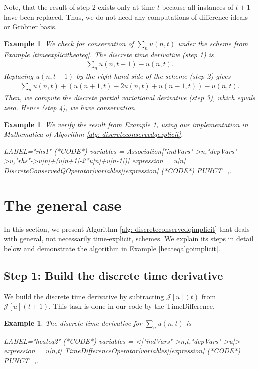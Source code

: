 \documentclass[sigconf,twocolumn]{acmart}
\newcommand{\1}{{\chi}}
\numberwithin{equation}{section}
\theoremstyle{thmlemcorr}
\numberwithin{theorem}{section}
\theoremstyle{thmlemcorr*}
\theoremstyle{defi}
\theoremstyle{remexample}
\newtheorem{example}[theorem]{Example}
\theoremstyle{ass}
\begin{document}
Note, that the result of step 2 exists only at time $t$ because all instances of $t+1$ have been replaced. Thus, we do not need any computations of difference ideals or Gr{\"o}bner basis.
\begin{example}
	\label{timeexplicitheateqalgo}
	We check for conservation of $\sum_nu(n,t)$ under the scheme from Example \ref{timeexplicitheateq}.
	The discrete time derivative (step 1) is
	\begin{gather*}
		\sum_nu(n,t+1)-u(n,t).
	\end{gather*}
	Replacing $u(n,t+1)$ by the right-hand side of the scheme (step 2) gives
	\begin{gather*}
		\sum_nu(n,t)+(u(n+1,t)-2u(n,t)+u(n-1,t))-u(n,t).
	\end{gather*}
	Then, we compute the discrete partial variational derivative (step 3), which equals zero. Hence (step 4), we have conservation.
\end{example}
\begin{example}
	\label{heatex1}
	We verify the result from Example \ref{timeexplicitheateqalgo}, using our implementation in {\sc Mathematica} of Algorithm \ref{alg: discreteconservedqexplicit}.
	\begin{EXE}
		LABEL="rhs1"
		(*CODE*)
		variables = Association["indVars"->{n},"depVars"->{u},"rhs"->{u[n]+(u[n+1]-2*u[n]+u[n-1])}]
		expression = u[n]
		DiscreteConservedQOperator[variables][expression]
		(*CODE*)
		PUNCT={,.}
	\end{EXE}
	\begin{small}
		
		
	\end{small}
\end{example}
\section{The general case}
In this section, we present Algorithm \ref{alg: discreteconservedqimplicit} that deals with general, not necessarily time-explicit, schemes. We explain its steps in detail below and demonstrate the algorithm in Example \ref{heateqalgoimplicit}.

\subsection*{Step 1: Build the discrete time derivative}
We build the discrete time derivative by subtracting $\mathcal{J}[u](t)$ from $\mathcal{J}[u](t+1)$. This task is done in our code by the {\sc TimeDifference}.
	\begin{example}
		The discrete time derivative for $\sum_n u(n,t)$ is
		\begin{EXE}
			LABEL="heateq2"
			(*CODE*)
			variables = <|"indVars"->{n,t},"depVars"->{u}|>
			expression = u[n,t]
			TimeDifferenceOperator[variables][expression]
			(*CODE*)
			PUNCT={,.}
		\end{EXE}
		
		\begin{small}
			
			
		\end{small}
	\end{example}
\end{document}
